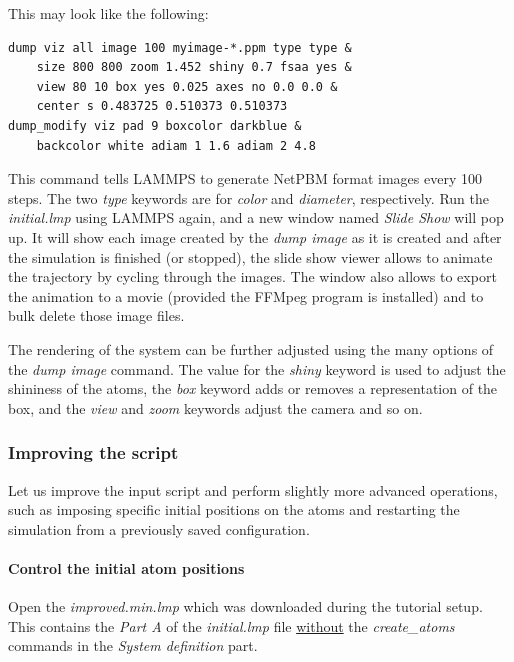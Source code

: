 \documentclass[9pt,tutorial]{livecoms}
\renewcommand{\emph}[1]{\underline{#1}}
\begin{document}
This may look like the following:
\begin{lstlisting}
dump viz all image 100 myimage-*.ppm type type &
    size 800 800 zoom 1.452 shiny 0.7 fsaa yes &
    view 80 10 box yes 0.025 axes no 0.0 0.0 &
    center s 0.483725 0.510373 0.510373
dump_modify viz pad 9 boxcolor darkblue &
    backcolor white adiam 1 1.6 adiam 2 4.8
\end{lstlisting}
This command tells LAMMPS to generate NetPBM format images every 100
steps. The two \textit{type} keywords are for \textit{color} and
\textit{diameter}, respectively.  Run the \textit{initial.lmp} using
LAMMPS again, and a new window named \textit{Slide Show} will pop up.
It will show each image created by the \textit {dump image} as it is
created and after the simulation is finished (or stopped), the slide
show viewer allows to animate the trajectory by cycling through the
images.  The window also allows to export the animation to a movie
(provided the FFMpeg program is installed) and to bulk delete those
image files.

The rendering of the system can be further adjusted using the many
options of the \textit{dump image} command.  The value for the
\textit{shiny} keyword is used to adjust the shininess of the atoms, the
\textit{box} keyword adds or removes a representation of the box, and
the \textit{view} and \textit{zoom} keywords adjust the camera and so
on.

\subsubsection{Improving the script}

Let us improve the input script and perform slightly more advanced operations,
such as imposing specific initial positions on the atoms and restarting the
simulation from a previously saved configuration.

\paragraph{Control the initial atom positions}
Open the \textit{improved.min.lmp} which was downloaded during the
tutorial setup.  This contains the \textit{Part A} of the
\textit{initial.lmp} file \emph{without} the \textit{create\_atoms}
commands in the \textit{System definition} part.
\end{document}
